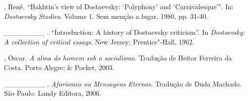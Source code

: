 \begin{Parskip}
, René. ``Bakhtin's view of Dostoevsky: `Polyphony' and
`Carnivalesque'"\emph{.} In: \emph{Dostoevsky Studies.} Volume 1. Sem
menção a lugar. 1980, pp. 31-40.

\_\_\_\_\_\_\_\_ . ``Introduction: A history of Dostoevsky criticism''.
In \emph{Dostoevsky: A collection of critical essays}. New Jersey:
Prentice"-Hall, 1962.

, Oscar. \emph{A alma do homem sob o socialismo.} Tradução de
Heitor Ferreira da Costa. Porto Alegre: \& Pocket, 2003.

\_\_\_\_\_\_\_\_ . \emph{Aforismos ou Mensagens Eternas}. Tradução de
Duda Machado. São Paulo: Landy Editora, 2006.

\end{Parskip}

